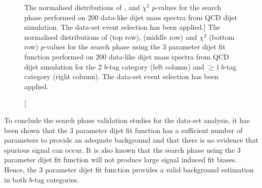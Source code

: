 \begin{figure}[!thb]
\begin{center}
  \end{center}
  \vspace{-1em}
  \caption
      [The normalised distributions of \bh{}, \dhunt{} and $\chi^{2}$  \mbox{$p$-value}s for
        the search phase performed on 200 data-like dijet mass spectra from QCD dijet simulation.
        The \summer{} data-set event selection has been applied.]
      {The normalised distributions of \bh{} (top row),  \dhunt{} (middle row) and $\chi^{2}$ (bottom row) \mbox{$p$-value}s for
        the search phase using the 3 parameter dijet fit function performed on
        200 data-like dijet mass spectra from QCD dijet simulation
        for the 2 $b$-tag category (left column) and $\geq1~b$-tag category (right column).
        The \summer{} data-set event selection has been applied.
        \label{fig:pValueHists}}

\end{figure}

To conclude the search phase validation studies for the \summer{} data-set analysis,
it has been shown that the 3 parameter dijet fit function has a
sufficient number of parameters to provide an adequate background
and that there is no evidence that spurious signal can occur.
It is also known that the search phase using the 3 parameter dijet fit function
will not produce large signal induced fit biases.
Hence, the 3 parameter dijet fit function
provides a valid background estimation in both $b$-tag categories.


